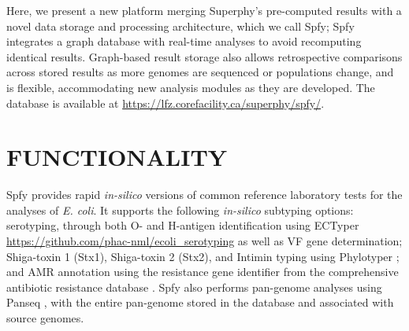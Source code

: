\documentclass{article}
\begin{document}
Here, we present a new platform merging Superphy's pre-computed results with a novel data storage and processing architecture, which we call Spfy; Spfy integrates a graph database with real-time analyses to avoid recomputing identical results. Graph-based result storage also allows retrospective comparisons across stored results as more genomes are sequenced or populations change, and is flexible, accommodating new analysis modules as they are developed. The database is available at \url{https://lfz.corefacility.ca/superphy/spfy/}.



\enlargethispage{-65.1pt}



\section{FUNCTIONALITY}


Spfy provides rapid \textit{in-silico} versions of common reference laboratory tests for the analyses of \textit{E. coli}. It supports the following \textit{in-silico} subtyping options: serotyping, through both O- and H-antigen identification using ECTyper \url{https://github.com/phac-nml/ecoli_serotyping} as well as VF gene determination; Shiga-toxin 1 (Stx1), Shiga-toxin 2 (Stx2), and Intimin typing using Phylotyper \cite{whiteside2017phylotyper}; and AMR annotation using the resistance gene identifier from the comprehensive antibiotic resistance database \cite{mcarthur2013comprehensive}. Spfy also performs pan-genome analyses using Panseq \cite{laing2010pan}, with the entire pan-genome stored in the database and associated with source genomes.
\end{document}
